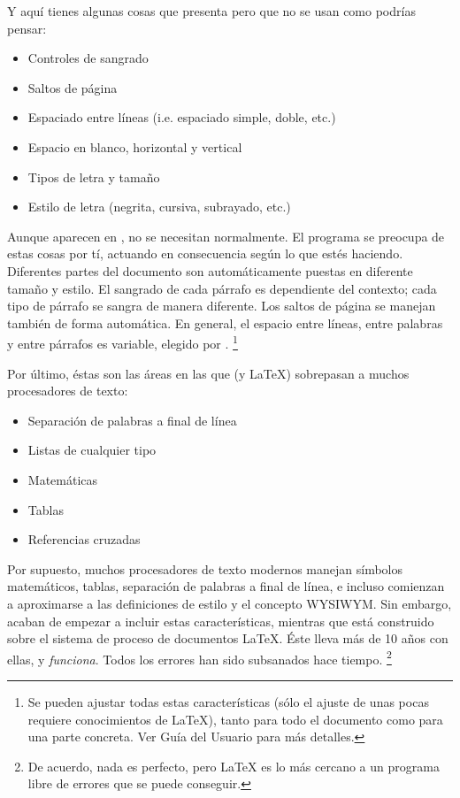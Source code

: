 Y aquí tienes algunas cosas que presenta \LyX{} pero que no se usan
como podrías pensar:

\begin{itemize}
\item Controles de sangrado
\item Saltos de página
\item Espaciado entre líneas (i.e. espaciado simple, doble, etc.)
\item Espacio en blanco, horizontal y vertical
\item Tipos de letra y tamaño
\item Estilo de letra (negrita, cursiva, subrayado, etc.)
\end{itemize}
Aunque aparecen en \LyX{}, no se necesitan normalmente. El programa
se preocupa de estas cosas por tí, actuando en consecuencia según
lo que estés haciendo. Diferentes partes del documento son automáticamente
puestas en diferente tamaño y estilo. El sangrado de cada párrafo
es dependiente del contexto; cada tipo de párrafo se sangra de manera
diferente. Los saltos de página se manejan también de forma automática.
En general, el espacio entre líneas, entre palabras y entre párrafos
es variable, elegido por \LyX{}.%
\footnote{Se pueden ajustar todas estas características (sólo el ajuste de unas
pocas requiere conocimientos de \LaTeX{}), tanto para todo el documento
como para una parte concreta. Ver Guía del Usuario para más detalles.%
}

Por último, éstas son las áreas en las que \LyX{} (y \LaTeX{}) sobrepasan
a muchos procesadores de texto:

\begin{itemize}
\item Separación de palabras a final de línea
\item Listas de cualquier tipo
\item Matemáticas
\item Tablas
\item Referencias cruzadas
\end{itemize}
Por supuesto, muchos procesadores de texto modernos manejan símbolos
matemáticos, tablas, separación de palabras a final de línea, e incluso
comienzan a aproximarse a las definiciones de estilo y el concepto
WYSIWYM. Sin embargo, acaban de empezar a incluir estas características,
mientras que \LyX{} está construido sobre el sistema de proceso de
documentos \LaTeX{}. Éste lleva más de 10 años con ellas, y \emph{funciona}.
Todos los errores han sido subsanados hace tiempo.%
\footnote{De acuerdo, nada es perfecto, pero \LaTeX{} es lo más cercano a un
programa libre de errores que se puede conseguir.%
}


